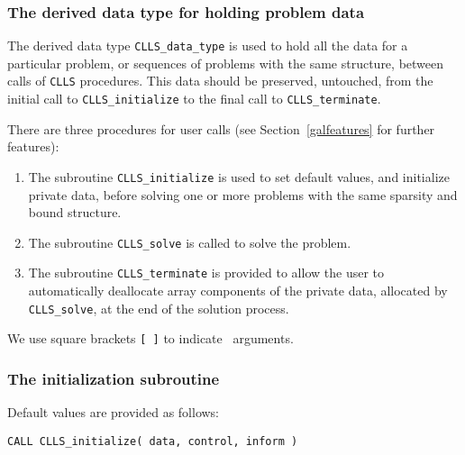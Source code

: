 \documentclass{galahad}
\newcommand{\packagename}{CLLS}
\begin{document}

\subsubsection{The derived data type for holding problem data}\label{typedata}
The derived data type
{\tt \packagename\_data\_type}
is used to hold all the data for a particular problem,
or sequences of problems with the same structure, between calls of
{\tt \packagename} procedures.
This data should be preserved, untouched, from the initial call to
{\tt \packagename\_initialize}
to the final call to
{\tt \packagename\_terminate}.


\galarguments
There are three procedures for user calls
(see Section~\ref{galfeatures} for further features):

\begin{enumerate}
\item The subroutine
      {\tt \packagename\_initialize}
      is used to set default values, and initialize private data,
      before solving one or more problems with the
      same sparsity and bound structure.
\item The subroutine
      {\tt \packagename\_solve}
      is called to solve the problem.
\item The subroutine
      {\tt \packagename\_terminate}
      is provided to allow the user to automatically deallocate array
       components of the private data, allocated by
       {\tt \packagename\_solve},
       at the end of the solution process.
\end{enumerate}
We use square brackets {\tt [ ]} to indicate \optional\ arguments.


\subsubsection{The initialization subroutine}\label{subinit}
 Default values are provided as follows:
\vspace*{1mm}

\hspace{8mm}
{\tt CALL \packagename\_initialize( data, control, inform )}
\end{document}
